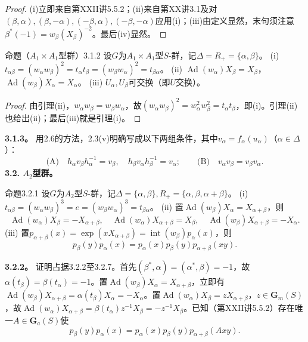 \begin{proof}
(i)立即来自第XXII讲5.5.2；(ii)来自第XX讲3.1及对$(\beta,\alpha),(\beta,-\alpha),(-\beta,\alpha),(-\beta,-\alpha)$应用(i)；(iii)由定义显然，末句须注意$\beta^*(-1)=w_\beta(X_\beta)^{-2}$。最后(iv)显然。
\end{proof}
\begin{SGAresult}{命题（$A_1\times A_1$型群）}{3.1.2}
设$G$为$A_1\times A_1$型$S$-群，记$\Delta=R_+=\{\alpha,\beta\}$。
(i) $t_{\alpha\beta}=(w_\alpha w_\beta)^2=t_\alpha t_\beta=(w_\beta w_\alpha)^2=t_{\beta\alpha}$。
(ii) $\operatorname{Ad}(w_\alpha)X_\beta=X_\beta$，$\operatorname{Ad}(w_\beta)X_\alpha=X_\alpha$。
(iii) $U_\alpha,U_\beta$可交换（即$U$交换）。
\end{SGAresult}
\begin{proof}
由引理(ii)，$w_\alpha w_\beta=w_\beta w_\alpha$，故$(w_\alpha w_\beta)^2=w_\alpha^2w_\beta^2=t_\alpha t_\beta$，即(i)。引理(ii)也给出(ii)；最后(iii)就是引理(i)。
\end{proof}
\textbf{3.1.3。} 用2.6的方法，2.3(v)明确写成以下两组条件，其中$v_\alpha=f_\alpha(u_\alpha)$（$\alpha\in\Delta$）：
\[\text{(A)}\quad h_\alpha v_\beta h_\alpha^{-1}=v_\beta,\quad h_\beta v_\alpha h_\beta^{-1}=v_\alpha;\qquad \text{(B)}\quad v_\alpha v_\beta=v_\beta v_\alpha.\]
\textbf{3.2. $A_2$型群。}
\begin{SGAresult}{命题}{3.2.1}
设$G$为$A_2$型$S$-群，记$\Delta=\{\alpha,\beta\},R_+=\{\alpha,\beta,\alpha+\beta\}$。
(i) $t_{\alpha\beta}=(w_\alpha w_\beta)^3=e=(w_\beta w_\alpha)^3=t_{\beta\alpha}$。
(ii) 置$\operatorname{Ad}(w_\beta)X_\alpha=X_{\alpha+\beta}$，则
\[\operatorname{Ad}(w_\alpha)X_\beta=-X_{\alpha+\beta},\quad\operatorname{Ad}(w_\alpha)X_{\alpha+\beta}=X_\beta,\quad\operatorname{Ad}(w_\beta)X_{\alpha+\beta}=-X_\alpha.\]
(iii) 置$p_{\alpha+\beta}(x)=\exp(xX_{\alpha+\beta})=\operatorname{int}(w_\beta)p_\alpha(x)$，则
\[p_\beta(y)p_\alpha(x)=p_\alpha(x)p_\beta(y)p_{\alpha+\beta}(xy).\]
\end{SGAresult}
\textbf{3.2.2。} 证明占据3.2.2至3.2.7。首先$(\beta^*,\alpha)=(\alpha^*,\beta)=-1$，故$\alpha(t_\beta)=\beta(t_\alpha)=-1$。置$\operatorname{Ad}(w_\beta)X_\alpha=X_{\alpha+\beta}$，立即有$\operatorname{Ad}(w_\beta)X_{\alpha+\beta}=\alpha(t_\beta)X_\alpha=-X_\alpha$。置$\operatorname{Ad}(w_\alpha)X_\beta=zX_{\alpha+\beta}$，$z\in\mathbf G_m(S)$，故$\operatorname{Ad}(w_\alpha)X_{\alpha+\beta}=\beta(t_\alpha)z^{-1}X_\beta=-z^{-1}X_\beta$。已知（第XXII讲5.5.2）存在唯一$A\in\mathbf G_a(S)$使
\[p_\beta(y)p_\alpha(x)=p_\alpha(x)p_\beta(y)p_{\alpha+\beta}(Axy).\tag{+}\]
